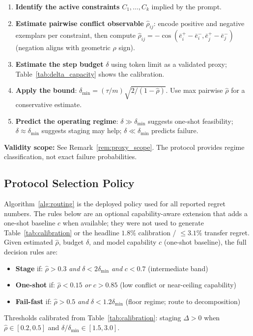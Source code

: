 \documentclass{article}
\theoremstyle{plain}
\theoremstyle{definition}
\theoremstyle{remark}
\newcommand{\rhohat}{\hat{\rho}}
\begin{document}
\begin{enumerate}[nosep,leftmargin=*]
\item \textbf{Identify the active constraints} $C_1, \ldots, C_k$ implied by the prompt.
\item \textbf{Estimate pairwise conflict observable} $\rhohat_{ij}$: encode positive and negative exemplars per constraint, then compute $\rhohat_{ij} = -\cos(\bar{e}^+_i - \bar{e}^-_i, \bar{e}^+_j - \bar{e}^-_j)$ (negation aligns with geometric $\rho$ sign).
\item \textbf{Estimate the step budget} $\delta$ using token limit as a validated proxy; Table~\ref{tab:delta_capacity} shows the calibration.
\item \textbf{Apply the bound}: $\delta_{\min} = (\tau/m)\sqrt{2/(1-\rhohat)}$. Use max pairwise $\rhohat$ for a conservative estimate.
\item \textbf{Predict the operating regime}: $\delta \gg \delta_{\min}$ suggests one-shot feasibility; $\delta \approx \delta_{\min}$ suggests staging may help; $\delta \ll \delta_{\min}$ predicts failure.
\end{enumerate}

\noindent\textbf{Validity scope:} See Remark~\ref{rem:proxy_scope}. The protocol provides regime classification, not exact failure probabilities.

\subsection{Protocol Selection Policy}\label{app:protocol_policy}

Algorithm~\ref{alg:routing} is the deployed policy used for all reported regret numbers. The rules below are an optional capability-aware extension that adds a one-shot baseline $c$ when available; they were not used to generate Table~\ref{tab:calibration} or the headline $1.8\%$ calibration / $\le 3.1\%$ transfer regret. Given estimated $\rhohat$, budget $\delta$, and model capability $c$ (one-shot baseline), the full decision rules are:
\begin{itemize}[nosep,leftmargin=*]
\item \textbf{Stage} if: $\rhohat > 0.3$ \emph{and} $\delta < 2\delta_{\min}$ \emph{and} $c < 0.7$ (intermediate band)
\item \textbf{One-shot} if: $\rhohat < 0.15$ \emph{or} $c > 0.85$ (low conflict or near-ceiling capability)
\item \textbf{Fail-fast} if: $\rhohat > 0.5$ \emph{and} $\delta < 1.2\delta_{\min}$ (floor regime; route to decomposition)
\end{itemize}
Thresholds calibrated from Table~\ref{tab:calibration}: staging $\Delta > 0$ when $\rhohat \in [0.2, 0.5]$ and $\delta/\delta_{\min} \in [1.5, 3.0]$.
\end{document}
